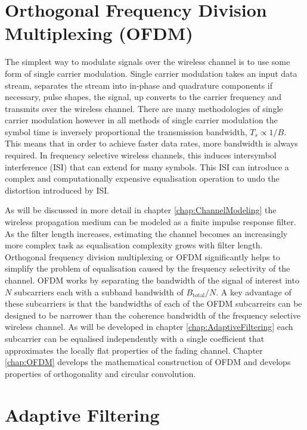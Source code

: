 \section{Orthogonal Frequency Division Multiplexing %
(OFDM)}
\label{sec:OFDMIntro}
The simplest way to modulate signals over the wireless %
channel is to use some form of single carrier modulation. %
Single carrier modulation takes an input data stream, %
separates the stream into in-phase and quadrature components %
if necessary, pulse shapes, the signal, up converts to the %
carrier frequency and transmits over the wireless channel. %
There are many methodologies of single carrier modulation %
however in all methods of single carrier modulation %
the symbol time is inversely proportional the transmission %
bandwidth, $T_{s} \propto 1/B$. This means that in order to %
achieve faster data rates, more bandwidth is always required. %
In frequency selective wireless channels, this induces intersymbol %
interference (ISI) that can extend for many symbols. This ISI %
can introduce a complex and computationally expensive equalisation %
operation to undo the distortion introduced by ISI.

As will be discussed in more detail in chapter %
\ref{chap:ChannelModeling} the wireless propagation medium can be %
modeled as a finite impulse response filter\cite{Jer00}. 
As the filter length increases, estimating %
the channel becomes an increasingly more complex task as %
equalisation complexity grows with filter length. %
Orthogonal frequency division multiplexing or OFDM significantly %
helps to simplify the problem of equalisation caused by %
the frequency selectivity of the channel. OFDM works by %
separating the bandwidth of the signal of interest into %
$N$ subcarriers each with a subband bandwidth of %
$B_{\text{total}}/N$. A key advantage of these subcarriers %
is that the bandwidths of each of the OFDM subcarreirs can %
be designed to be narrower than the coherence bandwidth %
of the frequency selective wireless channel. As will be %
developed in chapter \ref{chap:AdaptiveFiltering} each %
subcarrier can be equalised independently with a single %
coefficient that approximates the locally flat properties %
of the fading channel. Chapter \ref{chap:OFDM} develops %
the mathematical construction of OFDM and develops %
properties of orthogonality and circular convolution.
\newpage
\section{Adaptive Filtering}

